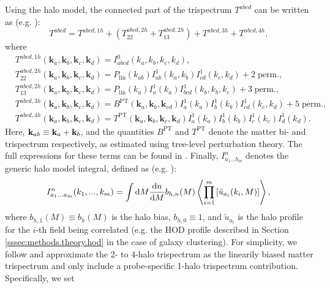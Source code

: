 \documentclass[a4paper,11pt]{article}
\begin{document}
    Using the halo model, the connected part of the trispectrum $T^{abcd}$ can be written as (e.g. \cite{Takada:2013}):
    \begin{equation}
      T^{abcd} = T^{abcd, 1h} + (T^{abcd, 2h}_{22} + T^{abcd, 2h}_{13}) + T^{abcd, 3h} + T^{abcd, 4h},
    \end{equation}
    where
    \begin{equation}
    \begin{aligned}
      &T^{abcd, 1h}(\mathbf{k}_{a}, \mathbf{k}_{b}, \mathbf{k}_{c}, \mathbf{k}_{d}) = I^{0}_{abcd}(k_{a}, k_{b}, k_{c}, k_{d}), \\
      &T^{abcd, 2h}_{22}(\mathbf{k}_{a}, \mathbf{k}_{b}, \mathbf{k}_{c}, \mathbf{k}_{d}) = P_{\mathrm{lin}}(k_{ab})I^{1}_{ab}(k_{a}, k_{b})I^{1}_{cd}(k_{c}, k_{d}) + 2 \; \mathrm{perm.}, \\
      &T^{abcd, 2h}_{13}(\mathbf{k}_{a}, \mathbf{k}_{b}, \mathbf{k}_{c}, \mathbf{k}_{d}) = P_{\mathrm{lin}}(k_{a})I^{1}_{a}(k_{a})I^{1}_{bcd}(k_{b}, k_{b}, k_{c}) + 3 \; \mathrm{perm.}, \\
      &T^{abcd, 3h}(\mathbf{k}_{a}, \mathbf{k}_{b}, \mathbf{k}_{c}, \mathbf{k}_{d}) = B^{\mathrm{PT}}(\mathbf{k}_{a}, \mathbf{k}_{b}, \mathbf{k}_{cd})I^{1}_{a}(k_{a})I^{1}_{b}(k_{b})I^{1}_{cd}(k_{c}, k_{d}) + 5 \; \mathrm{perm.},\\
      &T^{abcd, 4h}(\mathbf{k}_{a}, \mathbf{k}_{b}, \mathbf{k}_{c}, \mathbf{k}_{d}) = T^{\mathrm{PT}}(\mathbf{k}_{a}, \mathbf{k}_{b}, \mathbf{k}_{c}, \mathbf{k}_{d})I^{1}_{a}(k_{a})I^{1}_{b}(k_{b})I^{1}_{c}(k_{c})I^{1}_{d}(k_{d}).
    \label{eq:halo-mod-trisp}
    \end{aligned}
    \end{equation}
    Here, ${\bf k}_{ab}\equiv {\bf k}_a+{\bf k}_b$, and the quantities $B^{\mathrm{PT}}$ and $T^{\mathrm{PT}}$ denote the matter bi- and trispectrum respectively, as estimated using tree-level perturbation theory. The full expressions for these terms can be found in \cite{Takada:2013}. Finally, $I^{n}_{a_1...b_m}$ denotes the generic halo model integral, defined as (e.g. \cite{Krause:2017}):
    \begin{equation}
      I^{n}_{a_1...a_m}(k_1,...,k_m) = \int \mathrm{d}M \frac{\mathrm{d}n}{\mathrm{d}M}b_{h, n}(M)  \left\langle\prod_{i=1}^m \left[\tilde{u}_{a_i}(k_i, M) \right]\right\rangle, \\
    \end{equation}
    where $b_{h,1}(M)\equiv b_h(M)$ is the halo bias, $b_{h,0}\equiv1$, and $\tilde{u}_{a_i}$ is the halo profile for the $i$-th field being correlated (e.g. the HOD profile described in Section \ref{sssec:methods.theory.hod} in the case of galaxy clustering). For simplicity, we follow \cite{Krause:2017} and approximate the 2- to 4-halo trispectrum as the linearily biased matter trispectrum and only include a probe-specific 1-halo trispectrum contribution. Specifically, we set 
\end{document}

